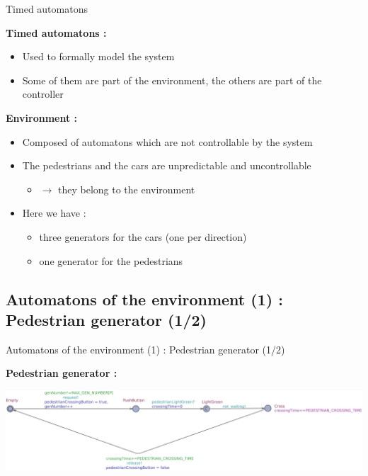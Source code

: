 \documentclass{bredelebeamer}
\begin{document}
\begin{frame}{Timed automatons}


\textbf{Timed automatons : }

\begin{itemize}

\item Used to formally model the system

\item Some of them are part of the environment, the others are part of the controller

\end{itemize}


\textbf{Environment : }

\begin{itemize}

\item Composed of automatons which are not controllable by the system

\item The pedestrians and the cars are unpredictable and uncontrollable
\begin{itemize}
\item $\longrightarrow$ they belong to the environment
\end{itemize}

\item Here we have :
\begin{itemize}
\item three generators for the cars (one per direction)
\item one generator for the pedestrians
\end{itemize}

\end{itemize}


\end{frame}


\subsection{Automatons of the environment (1) : Pedestrian generator (1/2) }

\begin{frame}{Automatons of the environment (1) : Pedestrian generator (1/2)}


\textbf{Pedestrian generator : }



\includegraphics[scale=0.20]{images/imagePedestrianGenerator.jpg}



\end{frame}
\end{document}
